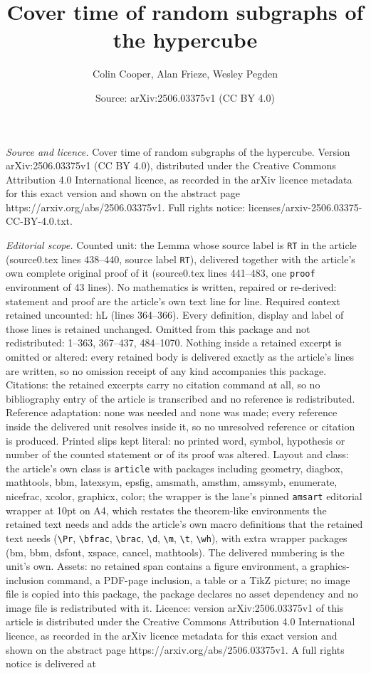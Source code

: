 \documentclass[10pt,a4paper]{amsart}
\title[Cover time of random subgraphs of the hypercube]{Cover time of random subgraphs of the hypercube}
\author{Colin Cooper, Alan Frieze, Wesley Pegden}
\date{Source: arXiv:2506.03375v1 (CC BY 4.0)}
\begin{document}
\maketitle

\noindent\emph{Source and licence.} Cover time of random subgraphs of the hypercube. Version arXiv:2506.03375v1 (CC BY 4.0), distributed under the Creative Commons Attribution 4.0 International licence, as recorded in the arXiv licence metadata for this exact version and shown on the abstract page https://arxiv.org/abs/2506.03375v1. Full rights notice: licenses/arxiv-2506.03375-CC-BY-4.0.txt.\par\smallskip

\noindent\textit{Editorial scope.} Counted unit: the Lemma whose source label is \texttt{RT} in the article (source0.tex lines 438--440, source label \texttt{RT}), delivered together with the article's own complete original proof of it (source0.tex lines 441--483, one \texttt{proof} environment of 43 lines). No mathematics is written, repaired or re-derived: statement and proof are the article's own text line for line. Required context retained uncounted: hL (lines 364--366). Every definition, display and label of those lines is retained unchanged. Omitted from this package and not redistributed: 1--363, 367--437, 484--1070. Nothing inside a retained excerpt is omitted or altered: every retained body is delivered exactly as the article's lines are written, so no omission receipt of any kind accompanies this package. Citations: the retained excerpts carry no citation command at all, so no bibliography entry of the article is transcribed and no reference is redistributed. Reference adaptation: none was needed and none was made; every reference inside the delivered unit resolves inside it, so no unresolved reference or citation is produced. Printed slips kept literal: no printed word, symbol, hypothesis or number of the counted statement or of its proof was altered. Layout and class: the article's own class is \texttt{article} with packages including geometry, diagbox, mathtools, bbm, latexsym, epsfig, amsmath, amsthm, amssymb, enumerate, nicefrac, xcolor, graphicx, color; the wrapper is the lane's pinned \texttt{amsart} editorial wrapper at 10pt on A4, which restates the theorem-like environments the retained text needs and adds the article's own macro definitions that the retained text needs (\texttt{\textbackslash Pr}, \texttt{\textbackslash bfrac}, \texttt{\textbackslash brac}, \texttt{\textbackslash d}, \texttt{\textbackslash m}, \texttt{\textbackslash t}, \texttt{\textbackslash wh}), with extra wrapper packages (bm, bbm, dsfont, xspace, cancel, mathtools). The delivered numbering is the unit's own. Assets: no retained span contains a figure environment, a graphics-inclusion command, a PDF-page inclusion, a table or a TikZ picture; no image file is copied into this package, the package declares no asset dependency and no image file is redistributed with it. Licence: version arXiv:2506.03375v1 of this article is distributed under the Creative Commons Attribution 4.0 International licence, as recorded in the arXiv licence metadata for this exact version and shown on the abstract page https://arxiv.org/abs/2506.03375v1. A full rights notice is delivered at 
\end{document}
